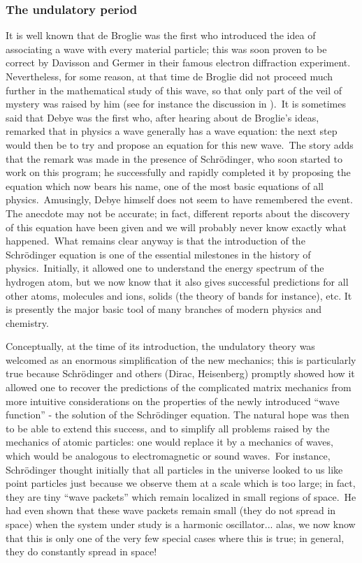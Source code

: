 \documentclass[12pt,onecolumn]{article}%
\begin{document}
\subsubsection{The undulatory period}

\label{undulatory}

It is well known that de Broglie was the first who introduced the idea of
associating a wave with every material particle; this was soon proven to be
correct by Davisson and Germer in their famous electron diffraction
experiment. Nevertheless, for some reason, at that time de Broglie did not
proceed much further in the mathematical study of this wave, so that only part
of the veil of mystery was raised by him (see for instance the discussion in
\cite{Darrigol-2}).\ It is sometimes said that Debye was the first who, after
hearing about de Broglie's ideas, remarked that in physics a wave generally
has a wave equation: the next step would then be to try and propose an
equation for this new wave.\ The story adds that the remark was made in the
presence of Schr\"{o}dinger, who soon started to work on this program; he
successfully and rapidly completed it by proposing the equation which now
bears his name, one of the most basic equations of all physics.\ Amusingly,
Debye himself does not seem to have remembered the event. The anecdote may not
be accurate; in fact, different reports about the discovery of this equation
have been given and we will probably never know exactly what happened.\ What
remains clear anyway is that the introduction of the Schr\"{o}dinger equation
is one of the essential milestones in the history of physics.\ Initially, it
allowed one to understand the energy spectrum of the hydrogen atom, but we now
know that it also gives successful predictions for all other atoms, molecules
and ions, solids (the theory of bands for instance), etc. It is presently the
major basic tool of many branches of modern physics and chemistry.

Conceptually, at the time of its introduction, the undulatory theory was
welcomed as an enormous simplification of the new mechanics; this is
particularly true because Schr\"{o}dinger and others (Dirac, Heisenberg)
promptly showed how it allowed one to recover the predictions of the
complicated matrix mechanics from more intuitive considerations on the
properties of the newly introduced ``wave function'' - the solution of the
Schr\"{o}dinger equation. The natural hope was then to be able to extend this
success, and to simplify all problems raised by the mechanics of atomic
particles: one would replace it by a mechanics of waves, which would be
analogous to electromagnetic or sound waves.\ For instance, Schr\"{o}dinger
thought initially that all particles in the universe looked to us like point
particles just because we observe them at a scale which is too large; in fact,
they are tiny ``wave packets'' which remain localized in small regions of
space.\ He had even shown that these wave packets remain small (they do not
spread in space) when the system under study is a harmonic oscillator... alas,
we now know that this is only one of the very few special cases where this is
true; in general, they do constantly spread in space!
\end{document}
